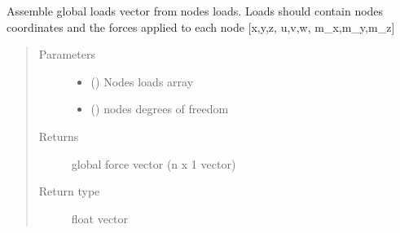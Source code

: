 \documentclass[letterpaper,10pt,english]{sphinxmanual}
\begin{document}
\begin{fulllineitems}
\label{\detokenize{api:beamon.core.assemble_global_f}}
Assemble global loads vector from nodes loads.
Loads should contain nodes coordinates and the forces applied to each node {[}x,y,z, u,v,w, m\_x,m\_y,m\_z{]}
\begin{quote}\begin{description}
\item[{Parameters}] \leavevmode\begin{itemize}
\item {} 
 () \textendash{} Nodes loads array

\item {} 
 () \textendash{} nodes degrees of freedom

\end{itemize}

\item[{Returns}] \leavevmode
global force vector (n x 1 vector)

\item[{Return type}] \leavevmode
float vector

\end{description}\end{quote}

\end{fulllineitems}

\end{document}
